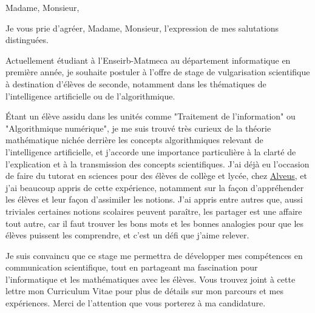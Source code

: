 \documentclass[11pt,a4paper,sans]{moderncv}
\begin{document}
\date{\today}
\opening{Madame, Monsieur,}
\closing{Je vous prie d’agréer, Madame, Monsieur, l’expression de mes salutations distinguées.}

\makelettertitle

Actuellement étudiant à l'Enseirb-Matmeca au département informatique en première année, je souhaite postuler à l'offre de stage de vulgarisation scientifique à destination d'élèves de seconde, notamment dans les thématiques de l'intelligence artificielle ou de l'algorithmique.

Étant un élève assidu dans les unités comme "Traitement de l'information" ou "Algorithmique numérique", je me suis trouvé très curieux de la théorie mathématique nichée derrière les concepts algorithmiques relevant de l'intelligence artificielle, et j’accorde une importance particulière à la clarté de l’explication et à la transmission des concepts scientifiques. J’ai déjà eu l’occasion de faire du tutorat en sciences pour des élèves de collège et lycée, chez \href{https://www.alveusclub.com/}{Alveus}, et j’ai beaucoup appris de cette expérience, notamment sur la façon d'appréhender les élèves et leur façon d'assimiler les notions. J'ai appris entre autres que, aussi triviales certaines notions scolaires peuvent paraître, les partager est une affaire tout autre, car il faut trouver les bons mots et les bonnes analogies pour que les élèves puissent les comprendre, et c'est un défi que j'aime relever.

Je suis convaincu que ce stage me permettra de développer mes compétences en communication scientifique, tout en partageant ma fascination pour l’informatique et les mathématiques avec les élèves. Vous trouvez joint à cette lettre mon Curriculum Vitae pour plus de détails sur mon parcours et mes expériences. Merci de l'attention que vous porterez à ma candidature.

\makeletterclosing
\end{document}
